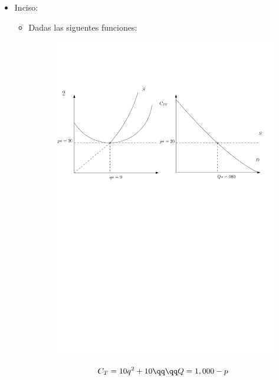 \begin{itemize}
    \item Inciso: 
        \begin{itemize}
            \item Dadas las siguentes funciones: 
                \begin{center}
                    \begin{figure}[!htb]
                        \centering
                        \includegraphics[width=18cm]{./Clases/figs/02}
                    \end{figure}
                \end{center}
                \begin{center}
                   \begin{align*}
                       C_{T} &= 10q^2+10 \qq \qq Q = 1,000-p \\ 
                   \end{align*}

\end{center}
\end{itemize}
\end{itemize}
